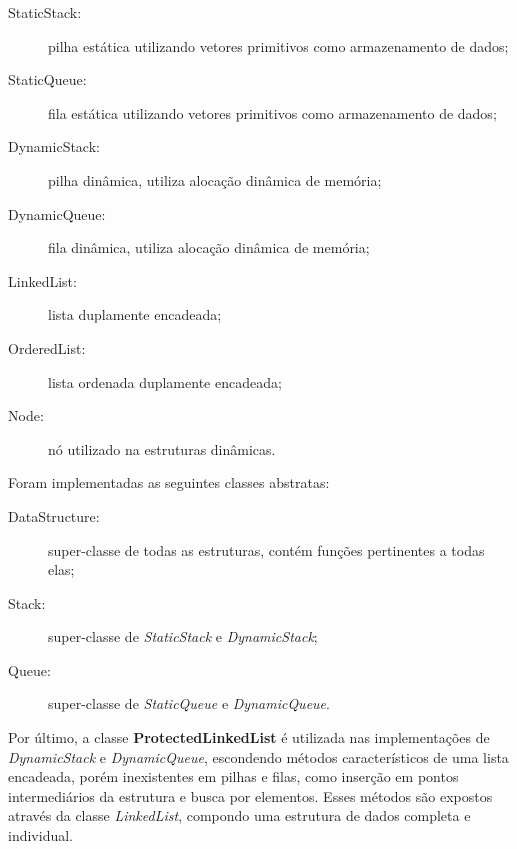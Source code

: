 \begin{description}
  \item[StaticStack:] pilha estática utilizando vetores primitivos como armazenamento de dados;
    \item[StaticQueue:] fila estática utilizando vetores primitivos como armazenamento de dados;
      \item[DynamicStack:] pilha dinâmica, utiliza alocação dinâmica de memória;
        \item[DynamicQueue:] fila dinâmica, utiliza alocação dinâmica de memória;
          \item[LinkedList:] lista duplamente encadeada;
            \item[OrderedList:] lista ordenada duplamente encadeada;
            \item[Node:] nó utilizado na estruturas dinâmicas.
\end{description}

Foram implementadas as seguintes classes abstratas:

\begin{description}
  \item[DataStructure:] super-classe de todas as estruturas, contém funções pertinentes a todas elas;
  \item[Stack:] super-classe de \emph{StaticStack} e \emph{DynamicStack};
  \item[Queue:] super-classe de \emph{StaticQueue} e \emph{DynamicQueue}.
\end{description}

Por último, a classe \textbf{ProtectedLinkedList} é utilizada nas implementações de \emph{DynamicStack} e \emph{DynamicQueue}, escondendo métodos característicos de uma lista encadeada, porém inexistentes em pilhas e filas, como inserção em pontos intermediários da estrutura e busca por elementos. Esses métodos são expostos através da classe \emph{LinkedList}, compondo uma estrutura de dados completa e individual.
